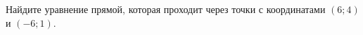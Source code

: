 \begin{ex}
	\begin{condition}
		Найдите уравнение прямой, которая проходит через точки с координатами \( (6;4) \) и \( (-6;1) \).
	\end{condition}
\end{ex}